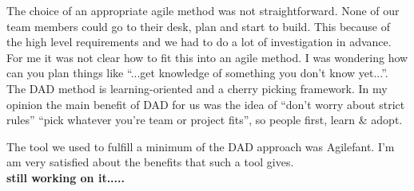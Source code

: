 The choice of an appropriate agile method was not straightforward. None of our
team members could go to their desk, plan and start to build. This because of
the high level requirements and we had to do a lot of investigation in advance.
For me it was not clear how to fit this into an agile method. I was wondering
how can you plan things like ``...get knowledge of something you don't know
yet...''. The DAD method is learning-oriented and a cherry picking framework. In
my opinion the main benefit of DAD for us was the idea of ``don't worry about
strict rules'' ``pick whatever you're team or project fits'', so people first,
learn \& adopt.

The tool we used to fulfill a minimum of the DAD approach was Agilefant.
I'm am very satisfied about the benefits that such a tool gives. 
\\
\textbf{still working on it.....}
